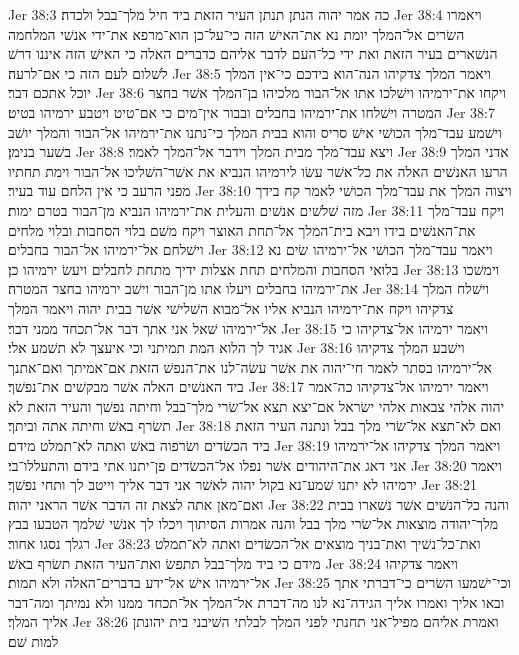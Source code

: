 Jer 38:3  כה אמר יהוה הנתן תנתן העיר הזאת ביד חיל מלך־בבל ולכדה׃
Jer 38:4  ויאמרו השׂרים אל־המלך יומת נא את־האישׁ הזה כי־על־כן הוא־מרפא את־ידי אנשׁי המלחמה הנשׁארים בעיר הזאת ואת ידי כל־העם לדבר אליהם כדברים האלה כי האישׁ הזה איננו דרשׁ לשׁלום לעם הזה כי אם־לרעה׃
Jer 38:5  ויאמר המלך צדקיהו הנה־הוא בידכם כי־אין המלך יוכל אתכם דבר׃
Jer 38:6  ויקחו את־ירמיהו וישׁלכו אתו אל־הבור מלכיהו בן־המלך אשׁר בחצר המטרה וישׁלחו את־ירמיהו בחבלים ובבור אין־מים כי אם־טיט ויטבע ירמיהו בטיט׃
Jer 38:7  וישׁמע עבד־מלך הכושׁי אישׁ סריס והוא בבית המלך כי־נתנו את־ירמיהו אל־הבור והמלך יושׁב בשׁער בנימן׃
Jer 38:8  ויצא עבד־מלך מבית המלך וידבר אל־המלך לאמר׃
Jer 38:9  אדני המלך הרעו האנשׁים האלה את כל־אשׁר עשׂו לירמיהו הנביא את אשׁר־השׁליכו אל־הבור וימת תחתיו מפני הרעב כי אין הלחם עוד בעיר׃
Jer 38:10  ויצוה המלך את עבד־מלך הכושׁי לאמר קח בידך מזה שׁלשׁים אנשׁים והעלית את־ירמיהו הנביא מן־הבור בטרם ימות׃
Jer 38:11  ויקח עבד־מלך את־האנשׁים בידו ויבא בית־המלך אל־תחת האוצר ויקח משׁם בלוי הסחבות ובלוי מלחים וישׁלחם אל־ירמיהו אל־הבור בחבלים׃
Jer 38:12  ויאמר עבד־מלך הכושׁי אל־ירמיהו שׂים נא בלואי הסחבות והמלחים תחת אצלות ידיך מתחת לחבלים ויעשׂ ירמיהו כן׃
Jer 38:13  וימשׁכו את־ירמיהו בחבלים ויעלו אתו מן־הבור וישׁב ירמיהו בחצר המטרה׃
Jer 38:14  וישׁלח המלך צדקיהו ויקח את־ירמיהו הנביא אליו אל־מבוא השׁלישׁי אשׁר בבית יהוה ויאמר המלך אל־ירמיהו שׁאל אני אתך דבר אל־תכחד ממני דבר׃
Jer 38:15  ויאמר ירמיהו אל־צדקיהו כי אגיד לך הלוא המת תמיתני וכי איעצך לא תשׁמע אלי׃
Jer 38:16  וישׁבע המלך צדקיהו אל־ירמיהו בסתר לאמר חי־יהוה את אשׁר עשׂה־לנו את־הנפשׁ הזאת אם־אמיתך ואם־אתנך ביד האנשׁים האלה אשׁר מבקשׁים את־נפשׁך׃
Jer 38:17  ויאמר ירמיהו אל־צדקיהו כה־אמר יהוה אלהי צבאות אלהי ישׂראל אם־יצא תצא אל־שׂרי מלך־בבל וחיתה נפשׁך והעיר הזאת לא תשׂרף באשׁ וחיתה אתה וביתך׃
Jer 38:18  ואם לא־תצא אל־שׂרי מלך בבל ונתנה העיר הזאת ביד הכשׂדים ושׂרפוה באשׁ ואתה לא־תמלט מידם׃
Jer 38:19  ויאמר המלך צדקיהו אל־ירמיהו אני דאג את־היהודים אשׁר נפלו אל־הכשׂדים פן־יתנו אתי בידם והתעללו־בי׃
Jer 38:20  ויאמר ירמיהו לא יתנו שׁמע־נא בקול יהוה לאשׁר אני דבר אליך וייטב לך ותחי נפשׁך׃
Jer 38:21  ואם־מאן אתה לצאת זה הדבר אשׁר הראני יהוה׃
Jer 38:22  והנה כל־הנשׁים אשׁר נשׁארו בבית מלך־יהודה מוצאות אל־שׂרי מלך בבל והנה אמרות הסיתוך ויכלו לך אנשׁי שׁלמך הטבעו בבץ רגלך נסגו אחור׃
Jer 38:23  ואת־כל־נשׁיך ואת־בניך מוצאים אל־הכשׂדים ואתה לא־תמלט מידם כי ביד מלך־בבל תתפשׂ ואת־העיר הזאת תשׂרף באשׁ׃
Jer 38:24  ויאמר צדקיהו אל־ירמיהו אישׁ אל־ידע בדברים־האלה ולא תמות׃
Jer 38:25  וכי־ישׁמעו השׂרים כי־דברתי אתך ובאו אליך ואמרו אליך הגידה־נא לנו מה־דברת אל־המלך אל־תכחד ממנו ולא נמיתך ומה־דבר אליך המלך׃
Jer 38:26  ואמרת אליהם מפיל־אני תחנתי לפני המלך לבלתי השׁיבני בית יהונתן למות שׁם׃

